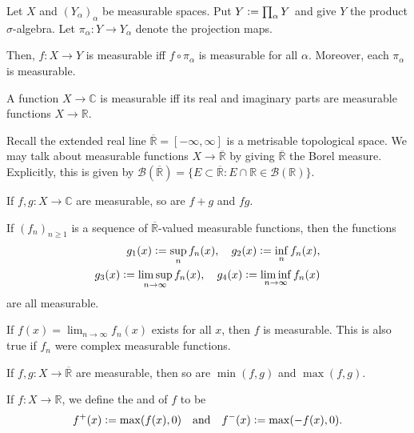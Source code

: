 \documentclass[12pt]{article}	%
\begin{document}
\begin{prop}
	Let $X$ and $(Y_{\alpha})_{\alpha}$ be measurable spaces. Put $Y \vcentcolon= \prod_{\alpha} Y$ and give $Y$ the product $\sigma$-algebra. Let $\pi_{\alpha} : Y \to Y_{\alpha}$ denote the projection maps.

	Then, $f : X \to Y$ is measurable iff $f \circ \pi_{\alpha}$ is measurable for all $\alpha$. Moreover, each $\pi_{\alpha}$ is measurable.
\end{prop}
\begin{cor}
	A function $X \to \mathbb{C}$ is measurable iff its real and imaginary parts are measurable functions $X \to \mathbb{R}$.
\end{cor}

Recall the extended real line $\overline{\mathbb{R}} = [-\infty, \infty]$ is a metrisable topological space. We may talk about measurable functions $X \to \overline{\mathbb{R}}$ by giving $\overline{\mathbb{R}}$ the Borel measure. Explicitly, this is given by $\mathcal{B}(\overline{\mathbb{R}}) = \{E \subset \overline{\mathbb{R}} : E \cap \mathbb{R} \in \mathcal{B}(\mathbb{R})\}$.

\begin{prop}
	If $f, g : X \to \mathbb{C}$ are measurable, so are $f + g$ and $fg$.

	If $(f_{n})_{n \ge 1}$ is a sequence of $\overline{\mathbb{R}}$-valued measurable functions, then the functions 
	\begin{align*} 
		g_{1}(x) \vcentcolon= \sup_{n} f_{n}(x), \quad g_{2}(x) \vcentcolon= \inf_{n} f_{n}(x), \\
		g_{3}(x) \vcentcolon= \limsup_{n \to \infty} f_{n}(x), \quad g_{4}(x) \vcentcolon= \liminf_{n \to \infty} f_{n}(x)
	\end{align*}
	are all measurable. 

	If $f(x) = \lim_{n \to \infty} f_{n}(x)$ exists for all $x$, then $f$ is measurable. This is also true if $f_{n}$ were complex measurable functions.

	If $f, g : X \to \overline{\mathbb{R}}$ are measurable, then so are $\min(f, g)$ and $\max(f, g)$.
\end{prop}

\begin{defn}
	If $f : X \to \mathbb{R}$, we define the  and  of $f$ to be
	\begin{equation*} 
		f^{+}(x) \vcentcolon= \max(f(x), 0) \quad\text{and}\quad f^{-}(x) \vcentcolon= \max(-f(x), 0).
	\end{equation*}
\end{defn}
\end{document}

